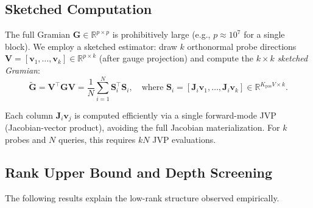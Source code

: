 \documentclass{article}
\newcommand{\R}{\mathbb{R}}
\newcommand{\bJ}{\mathbf{J}}
\newcommand{\bG}{\mathbf{G}}
\newcommand{\bV}{\mathbf{V}}
\begin{document}
\subsection{Sketched Computation}
\label{sec:sketched}

The full Gramian $\bG \in \R^{p \times p}$ is prohibitively large (e.g., $p \approx 10^7$ for a single block). We employ a sketched estimator: draw $k$ orthonormal probe directions $\bV = [\mathbf{v}_1, \ldots, \mathbf{v}_k] \in \R^{p \times k}$ (after gauge projection) and compute the $k \times k$ \emph{sketched Gramian}:
\begin{equation}\label{eq:sketch}
 \tilde{\bG} = \bV^\top \bG \bV = \frac{1}{N}\sum_{i=1}^{N} \mathbf{S}_i^\top \mathbf{S}_i,
 \quad \text{where } \mathbf{S}_{i} = [\bJ_i \mathbf{v}_1, \ldots, \bJ_i \mathbf{v}_k] \in \R^{K_{\text{pos}} V \times k}.
\end{equation}

Each column $\bJ_i \mathbf{v}_j$ is computed efficiently via a single forward-mode JVP (Jacobian-vector product), avoiding the full Jacobian materialization. For $k$ probes and $N$ queries, this requires $kN$ JVP evaluations.

\subsection{Rank Upper Bound and Depth Screening}
\label{sec:rank-bound}

The following results explain the low-rank structure observed empirically.
\end{document}
